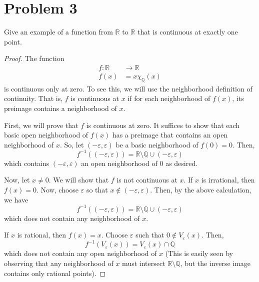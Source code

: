 \documentclass[fontsize=11pt]{scrartcl} %
\numberwithin{equation}{section} %
\numberwithin{figure}{section} %
\numberwithin{table}{section} %
\newcommand{\R}{\mathbb{R}}
\newcommand{\Q}{\mathbb{Q}}
\begin{document}
\section*{Problem 3}
Give an example of a function from $\R$ to $\R$ that is continuous at exactly one point.
\\
\begin{proof}
The function
\[
\begin{aligned}
f:\R&\to\R\\
f(x) &=x\chi_{\Q}(x)
\end{aligned}
\]
is continuous only at zero. To see this, we will use the neighborhood definition of
continuity. That is, $f$ is continuous at $x$ if for each neighborhood of $f(x)$, its
preimage contains a neighborhood of $x$.

First, we will prove that $f$ is continuous at zero. It suffices to show that each basic
open neighborhood of $f(x)$ has a preimage that contains an open neighborhood of $x$.
So, let $(-\varepsilon,\varepsilon)$ be a basic neighborhood of $f(0)=0$. Then,
\[
f^{-1}((-\varepsilon,\varepsilon)) = \R\setminus\Q\cup(-\varepsilon,\varepsilon)
\]
which contains $(-\varepsilon,\varepsilon)$ an open neighborhood of $0$ as desired.

Now, let $x \neq 0$. We will show that $f$ is not continuous at $x$. If $x$ is irrational,
then $f(x) = 0$. Now, choose $\varepsilon$ so that $x\not\in(-\varepsilon,\varepsilon)$.
Then, by the above calculation, we have
\[
f^{-1}((-\varepsilon,\varepsilon)) = \R\setminus\Q\cup(-\varepsilon,\varepsilon)
\]
which does not contain any neighborhood of $x$.

If $x$ is rational, then $f(x) = x$. Choose $\varepsilon$ such that $0\not\in V_{\varepsilon}(x)$.
Then,
\[
f^{-1}(V_{\varepsilon}(x)) = V_{\varepsilon}(x)\cap\Q
\]
which does not contain any open neighborhood of $x$ (This is easily seen by observing
that any neighborhood of $x$ must intersect $\R\setminus\Q$, but the inverse image contains
only rational points).
\end{proof}
\end{document}
